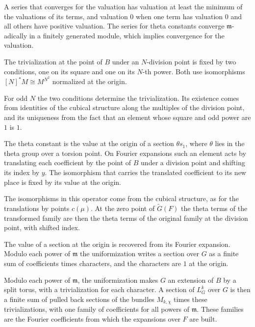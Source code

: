 A series that converges for the valuation has valuation at least the minimum of the valuations of its
terms, and valuation $0$ when one term has valuation $0$ and all others have positive valuation. The series
for theta constants converge $\mathfrak m$-adically in a finitely generated module, which implies
convergence for the valuation.

The trivialization at the point of $B$ under an $N$-division point is fixed by two conditions, one on its
square and one on its $N$-th power. Both use isomorphisms $[N]^*M\cong M^{N^2}$ normalized at the origin.

For odd $N$ the two conditions determine the trivialization. Its existence comes from identities of the
cubical structure along the multiples of the division point, and its uniqueness from the fact that an
element whose square and odd power are $1$ is $1$.

The theta constant is the value at the origin of a section $\theta s_1$, where $\theta$ lies in the theta
group over a torsion point. On Fourier expansions such an element acts by translating each coefficient by
the point of $B$ under a division point and shifting its index by $y$. The isomorphism that carries the
translated coefficient to its new place is fixed by its value at the origin.

The isomorphisms in this operator come from the cubical structure, as for the translations by points
$c(\mu)$. At the zero point of $\tilde G(F)$ the theta terms of the transformed family are then the theta terms
of the original family at the division point, with shifted index.

The value of a section at the origin is recovered from its Fourier expansion. Modulo each power of
$\mathfrak m$ the uniformization writes a section over $G$ as a finite sum of coefficients times characters,
and the characters are $1$ at the origin.

Modulo each power of $\mathfrak m$, the uniformization makes $G$ an extension of $B$ by a split torus, with a
trivialization for each character. A section of $L_G^k$ over $G$ is then a finite sum of pulled back sections of
the bundles $M_{k,\chi}$ times these trivializations, with one family of coefficients for all powers of
$\mathfrak m$. These families are the Fourier coefficients from which the expansions over $F$ are built.

